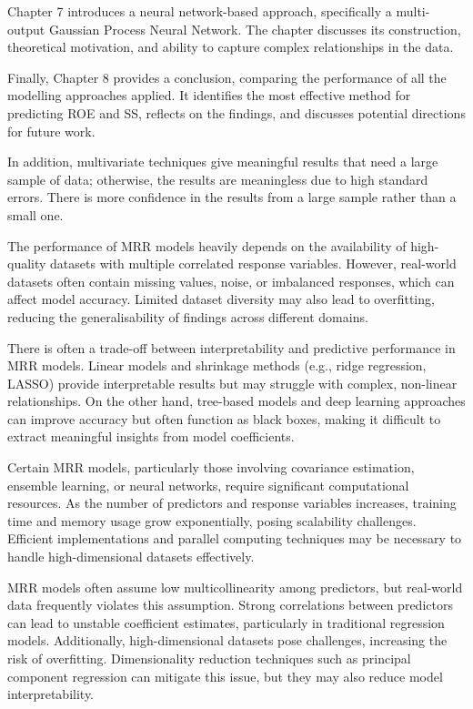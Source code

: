 Chapter 7 introduces a neural network-based approach, specifically a multi-output Gaussian Process Neural Network. The chapter discusses its construction, theoretical motivation, and ability to capture complex relationships in the data.

Finally, Chapter 8 provides a conclusion, comparing the performance of all the modelling approaches applied. It identifies the most effective method for predicting ROE and SS, reflects on the findings, and discusses potential directions for future work.




In addition, multivariate techniques give meaningful results that need a large sample of data; otherwise, the results are meaningless due to high standard errors.\cite{jackson2018multivariate} There is more confidence in the results from a large sample rather than a small one. 

The performance of MRR models heavily depends on the availability of high-quality datasets with multiple correlated response variables. However, real-world datasets often contain missing values, noise, or imbalanced responses, which can affect model accuracy. Limited dataset diversity may also lead to overfitting, reducing the generalisability of findings across different domains.

There is often a trade-off between interpretability and predictive performance in MRR models. Linear models and shrinkage methods (e.g., ridge regression, LASSO) provide interpretable results but may struggle with complex, non-linear relationships. On the other hand, tree-based models and deep learning approaches can improve accuracy but often function as black boxes, making it difficult to extract meaningful insights from model coefficients.

Certain MRR models, particularly those involving covariance estimation, ensemble learning, or neural networks, require significant computational resources. As the number of predictors and response variables increases, training time and memory usage grow exponentially, posing scalability challenges. Efficient implementations and parallel computing techniques may be necessary to handle high-dimensional datasets effectively.

MRR models often assume low multicollinearity among predictors, but real-world data frequently violates this assumption. Strong correlations between predictors can lead to unstable coefficient estimates, particularly in traditional regression models. Additionally, high-dimensional datasets pose challenges, increasing the risk of overfitting. Dimensionality reduction techniques such as principal component regression can mitigate this issue, but they may also reduce model interpretability.

